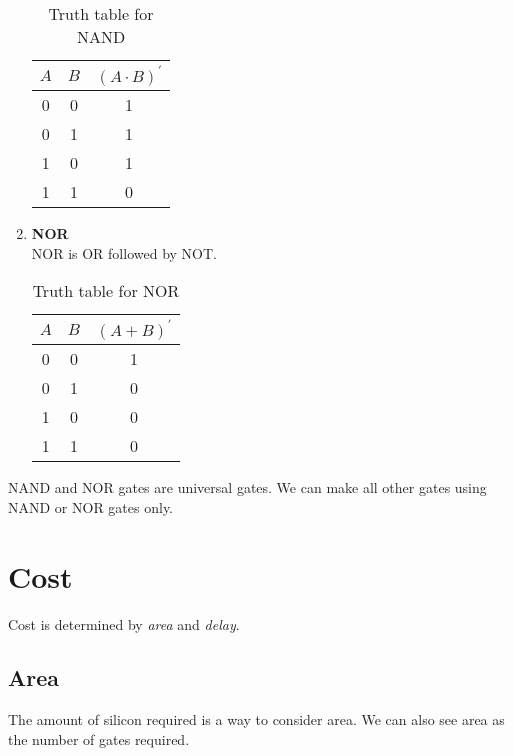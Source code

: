 \documentclass[oneside]{book}
\begin{document}
\begin{enumerate}
\begin{table}[ht]
\begin{tabular}{|cc|c|}
			      \hline
			      $A$ & $B$ & $(A\cdot B)^\prime$ \\
			      \hline
			      0   & 0   & 1                   \\
			      0   & 1   & 1                   \\
			      1   & 0   & 1                   \\
			      1   & 1   & 0                   \\
			      \hline
		      \end{tabular}
		      \caption{Truth table for NAND}
		      \label{truth_table_for_nand}
	      \end{table}
	\item \textbf{NOR}\\
	      NOR is OR followed by NOT.
	      \begin{table}[ht]
		      \centering
		      \begin{tabular}{|cc|c|}
			      \hline
			      $A$ & $B$ & $(A+ B)^\prime$ \\
			      \hline
			      0   & 0   & 1               \\
			      0   & 1   & 0               \\
			      1   & 0   & 0               \\
			      1   & 1   & 0               \\
			      \hline
		      \end{tabular}
		      \caption{Truth table for NOR}
		      \label{truth_table_for_nor}
	      \end{table}
\end{enumerate}

\noindent NAND and NOR gates are universal gates. We can make all other gates using NAND or NOR gates only.

\section{Cost}
Cost is determined by \textit{area} and \textit{delay}.
\subsection{Area}
The amount of silicon required is a way to consider area. We can also see area as the number of gates required.
\end{document}
